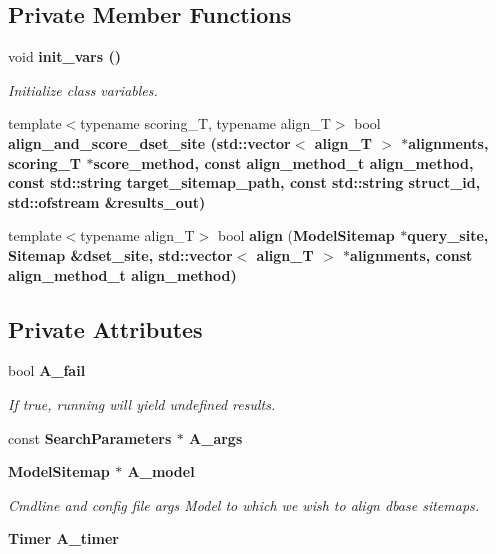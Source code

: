\subsection*{Private Member Functions}
\begin{CompactItemize}
\item 
void \bf{init\_\-vars} ()\label{classASCbase_1_1Search_2249af437ccb9705517b8ad80a6a0564}

\begin{CompactList}\small\item\em Initialize class variables. \item\end{CompactList}\item 
template$<$typename scoring\_\-T, typename align\_\-T$>$ bool \bf{align\_\-and\_\-score\_\-dset\_\-site} (std::vector$<$ align\_\-T $>$ $\ast$alignments, scoring\_\-T $\ast$score\_\-method, const align\_\-method\_\-t align\_\-method, const std::string target\_\-sitemap\_\-path, const std::string struct\_\-id, std::ofstream \&results\_\-out)
\item 
template$<$typename align\_\-T$>$ bool \textbf{align} (\bf{Model\-Sitemap} $\ast$query\_\-site, \bf{Sitemap} \&dset\_\-site, std::vector$<$ align\_\-T $>$ $\ast$alignments, const align\_\-method\_\-t align\_\-method)\label{classASCbase_1_1Search_fab7009bb634e1f71167f883d338ba98}

\end{CompactItemize}
\subsection*{Private Attributes}
\begin{CompactItemize}
\item 
bool \bf{A\_\-fail}\label{classASCbase_1_1Search_658d52e28d45179d6b9d1d6a205215ea}

\begin{CompactList}\small\item\em If true, running will yield undefined results. \item\end{CompactList}\item 
const \bf{Search\-Parameters} $\ast$ \textbf{A\_\-args}\label{classASCbase_1_1Search_da2546891b0401510843373abd2dafb1}

\item 
\bf{Model\-Sitemap} $\ast$ \bf{A\_\-model}\label{classASCbase_1_1Search_7b57373932f92cce7ab4bf5148851ede}

\begin{CompactList}\small\item\em Cmdline and config file args Model to which we wish to align dbase sitemaps. \item\end{CompactList}\item 
\bf{Timer} \textbf{A\_\-timer}\label{classASCbase_1_1Search_55335360d173f7c5c6bc04855f62bc04}

\end{CompactItemize}

